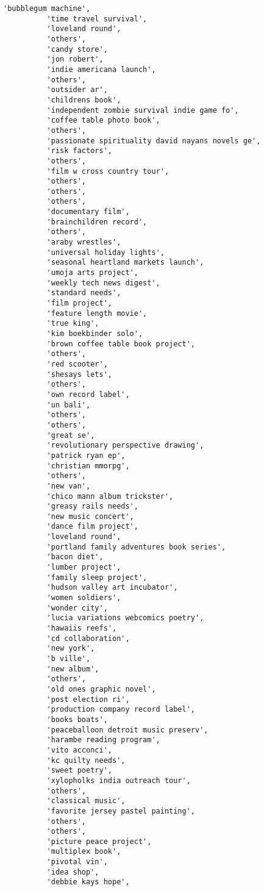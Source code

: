 \documentclass[11pt]{article}
\begin{document}
\begin{Verbatim}[commandchars=\\\{\}]
          'bubblegum machine',
          'time travel survival',
          'loveland round',
          'others',
          'candy store',
          'jon robert',
          'indie americana launch',
          'others',
          'outsider ar',
          'childrens book',
          'independent zombie survival indie game fo',
          'coffee table photo book',
          'others',
          'passionate spirituality david nayans novels ge',
          'risk factors',
          'others',
          'film w cross country tour',
          'others',
          'others',
          'others',
          'documentary film',
          'brainchildren record',
          'others',
          'araby wrestles',
          'universal holiday lights',
          'seasonal heartland markets launch',
          'umoja arts project',
          'weekly tech news digest',
          'standard needs',
          'film project',
          'feature length movie',
          'true king',
          'kim boekbinder solo',
          'brown coffee table book project',
          'others',
          'red scooter',
          'shesays lets',
          'others',
          'own record label',
          'un bali',
          'others',
          'others',
          'great se',
          'revolutionary perspective drawing',
          'patrick ryan ep',
          'christian mmorpg',
          'others',
          'new van',
          'chico mann album trickster',
          'greasy rails needs',
          'new music concert',
          'dance film project',
          'loveland round',
          'portland family adventures book series',
          'bacon diet',
          'lumber project',
          'family sleep project',
          'hudson valley art incubator',
          'women soldiers',
          'wonder city',
          'lucia variations webcomics poetry',
          'hawaiis reefs',
          'cd collaboration',
          'new york',
          'b ville',
          'new album',
          'others',
          'old ones graphic novel',
          'post election ri',
          'production company record label',
          'books boats',
          'peaceballoon detroit music preserv',
          'harambe reading program',
          'vito acconci',
          'kc quilty needs',
          'sweet poetry',
          'xylopholks india outreach tour',
          'others',
          'classical music',
          'favorite jersey pastel painting',
          'others',
          'others',
          'picture peace project',
          'multiplex book',
          'pivotal vin',
          'idea shop',
          'debbie kays hope',

\end{Verbatim}
\end{document}
